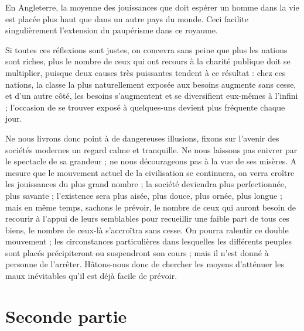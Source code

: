 \documentclass[french,twoside]{book} %
\newcommand\chapteropen{} %
\newcommand\chapterclose{} %
\renewcommand\chapteropen{} %
\renewcommand\chapterclose{} %
\begin{document}
En Angleterre, la moyenne des jouissances que doit espérer un homme dans la vie est placée plus haut que dans un autre pays du monde. Ceci facilite singulièrement l’extension du paupérisme dans ce royaume.\par
Si toutes ces réflexions sont justes, on concevra sans peine que plus les nations sont riches, plus le nombre de ceux qui ont recours à la charité publique doit se multiplier, puisque deux causes très puissantes tendent à ce résultat : chez ces nations, la classe la plus naturellement exposée aux besoins augmente sans cesse, et d’un autre côté, les besoins s’augmentent et se diversifient eux-mêmes à l’infini ; l’occasion de se trouver exposé à quelques-uns devient plus fréquente chaque jour.\par
Ne nous livrons donc point à de dangereuses illusions, fixons sur l’avenir des sociétés modernes un regard calme et tranquille. Ne nous laissons pas enivrer par le spectacle de sa grandeur ; ne nous décourageons pas à la vue de ses misères. A mesure que le mouvement actuel de la civilisation se continuera, on verra croître les jouissances du plus grand nombre ; la société deviendra plus perfectionnée, plus savante ; l’existence sera plus aisée, plus douce, plus ornée, plus longue ; mais en même temps, sachons le prévoir, le nombre de ceux qui auront besoin de recourir à l’appui de leurs semblables pour recueillir une faible part de tous ces biens, le nombre de ceux-là s’accroîtra sans cesse. On pourra ralentir ce double mouvement ; les circonstances particulières dans lesquelles les différents peuples sont placés précipiteront ou suspendront son cours ; mais il n’est donné à personne de l’arrêter. Hâtons-nous donc de chercher les moyens d’atténuer les maux inévitables qu’il est déjà facile de prévoir.
\chapterclose


\chapteropen
\chapter[Seconde partie]{Seconde partie}
\end{document}
